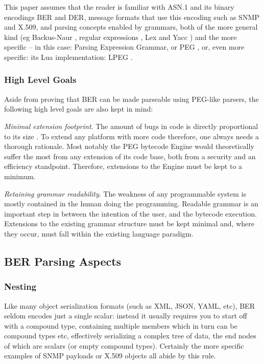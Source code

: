 This paper assumes that the reader is familiar with ASN.1 and its binary 
encodings BER and DER, message formats that use this encoding such as SNMP 
and X.509, and parsing concepts enabled by grammars, both of the more 
general kind (eg Backus-Naur \cite{bib:backusnaur},
regular expressions \cite{bib:regex}, Lex and Yacc \cite{bib:yacc}) and the 
more specific – in this case: Parsing Expression Grammar, or PEG
\cite{bib:peg}, or, 
even more specific: its Lua implementation: LPEG \cite{bib:lpeg}.

\subsubsection{High Level Goals}

Aside from proving that BER can be made parseable using PEG-like parsers, 
the following high level goals are also kept in mind:

\textit{Minimal extension footprint}. The amount of bugs in code is directly 
proportional to its size \cite{bib:bugs}.
To extend any platform with more code 
therefore, one always needs a thorough rationale. Most notably the PEG 
bytecode Engine would theoretically suffer the most from any extension of 
its code base, both from a security and an efficiency standpoint. 
Therefore, extensions to the Engine must be kept to a minimum.

\textit{Retaining grammar readability}.
The weakness of any programmable system is 
mostly contained in the human doing the programming. Readable grammar is 
an important step in between the intention of the user, and the bytecode 
execution. Extensions to the existing grammar structure must be kept 
minimal and, where they occur, must fall within the existing language 
paradigm.

\subsection{BER Parsing Aspects}

\subsubsection{Nesting}

Like many object serialization formats (such as XML, JSON, YAML, etc), BER 
seldom encodes just a single scalar: instead it usually requires you to 
start off with a compound type, containing multiple members which in turn 
can be compound types etc, effectively serializing a complex tree of data, 
the end nodes of which are scalars (or empty compound types).
Certainly the more specific examples 
of SNMP payloads or X.509 objects all abide by this rule.

